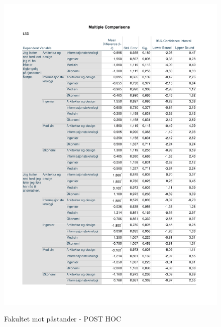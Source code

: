 \begin{figure}[H]
    \centering
    \includegraphics[scale=0.7]{case_1/bilder/Post_Hoc_test_fakultet-pastand.pdf}
    \label{fig:POST-HOC_fakultet-påstand}
    \caption{Fakultet mot påstander - POST HOC}
\end{figure}



